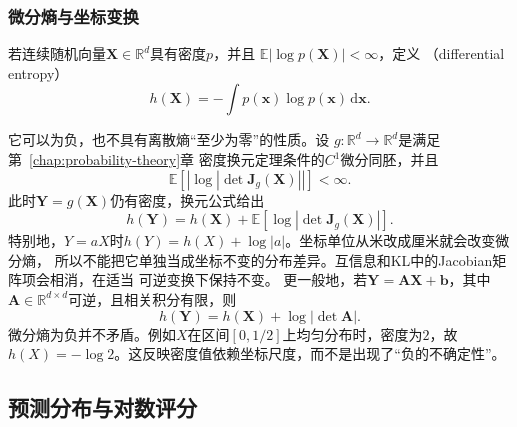 \subsubsection{微分熵与坐标变换}
\begin{definition}[微分熵]
  \label{def:information-differential-entropy}
若连续随机向量\(\bm{X}\in\mathbb{R}^d\)具有密度\(p\)，并且
\(\mathbb{E}|\log p(\bm{X})|<\infty\)，定义
（differential entropy）
\[
  h(\bm{X})
  =
  -\int p(\bm{x})\log p(\bm{x})\,\mathrm{d}\bm{x}.
\]
\end{definition}
它可以为负，也不具有离散熵“至少为零”的性质。设
\(g:\mathbb{R}^d\to\mathbb{R}^d\)是满足第~\ref{chap:probability-theory}章
密度换元定理条件的\(C^1\)微分同胚，并且
\[
  \mathbb{E}\!\left[
    \left|\log\left|\det\bm{J}_g(\bm{X})\right|\right|
  \right]
  <\infty.
\]
此时\(\bm{Y}=g(\bm{X})\)仍有密度，换元公式给出
\begin{equation}
  h(\bm{Y})
  =
  h(\bm{X})
  +
  \mathbb{E}\!\left[
    \log\left|\det\bm{J}_{g}(\bm{X})\right|
  \right].
  \label{eq:information-differential-entropy-transform}
\end{equation}
特别地，\(Y=aX\)时\(h(Y)=h(X)+\log|a|\)。坐标单位从米改成厘米就会改变微分熵，
所以不能把它单独当成坐标不变的分布差异。互信息和KL中的Jacobian矩阵项会相消，在适当
可逆变换下保持不变。
更一般地，若\(\bm{Y}=\bm{A}\bm{X}+\bm{b}\)，其中
\(\bm{A}\in\mathbb{R}^{d\times d}\)可逆，且相关积分有限，则
\[
  h(\bm{Y})=h(\bm{X})+\log|\det\bm{A}|.
\]
微分熵为负并不矛盾。例如\(X\)在区间\([0,1/2]\)上均匀分布时，密度为\(2\)，故
\(h(X)=-\log2\)。这反映密度值依赖坐标尺度，而不是出现了“负的不确定性”。
\subsection{预测分布与对数评分}
\label{sec:information-log-score-kl}
